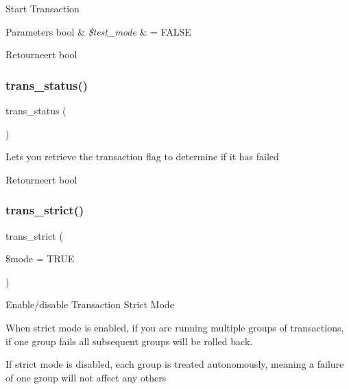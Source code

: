 Start Transaction


\begin{DoxyParams}[1]{Parameters}
bool & {\em \$test\+\_\+mode} & = F\+A\+L\+SE \\
\hline
\end{DoxyParams}
\begin{DoxyReturn}{Retourneert}
bool 
\end{DoxyReturn}
\mbox{\label{class_c_i___d_b__driver_a7ce49452153f13afde8f9c5212028be6}} 
\subsubsection{\texorpdfstring{trans\_status()}{trans\_status()}}
{\footnotesize\ttfamily trans\+\_\+status (\begin{DoxyParamCaption}{ }\end{DoxyParamCaption})}

Lets you retrieve the transaction flag to determine if it has failed

\begin{DoxyReturn}{Retourneert}
bool 
\end{DoxyReturn}
\mbox{\label{class_c_i___d_b__driver_a648f8e6b3d0c53ce2afd63cfcea1fe74}} 
\subsubsection{\texorpdfstring{trans\_strict()}{trans\_strict()}}
{\footnotesize\ttfamily trans\+\_\+strict (\begin{DoxyParamCaption}\item[{}]{\$mode = {\ttfamily TRUE} }\end{DoxyParamCaption})}

Enable/disable Transaction Strict Mode

When strict mode is enabled, if you are running multiple groups of transactions, if one group fails all subsequent groups will be rolled back.

If strict mode is disabled, each group is treated autonomously, meaning a failure of one group will not affect any others


